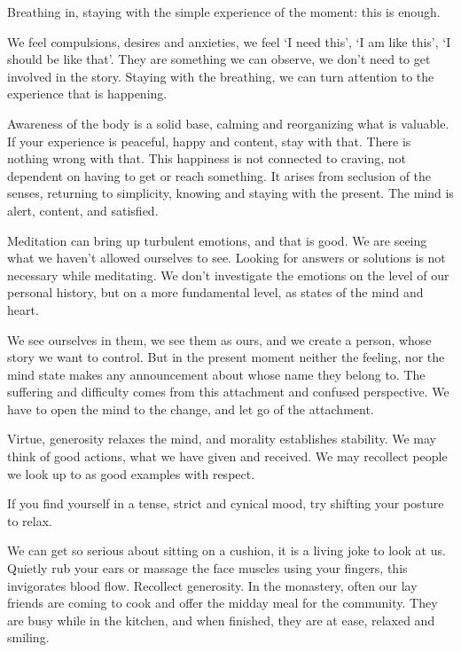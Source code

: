 
Breathing in, staying with the simple experience of the moment: this is
enough.

We feel compulsions, desires and anxieties, we feel `I need this', `I am
like this', `I should be like that'. They are something we can observe,
we don't need to get involved in the story. Staying with the breathing,
we can turn attention to the experience that is happening.

Awareness of the body is a solid base, calming and reorganizing what is
valuable. If your experience is peaceful, happy and content, stay with
that. There is nothing wrong with that. This happiness is not connected
to craving, not dependent on having to get or reach something. It arises
from seclusion of the senses, returning to simplicity, knowing and
staying with the present. The mind is alert, content, and satisfied.

\clearpage

Meditation can bring up turbulent emotions, and that is good. We are
seeing what we haven't allowed ourselves to see. Looking for answers or
solutions is not necessary while meditating. We don't investigate the
emotions on the level of our personal history, but on a more fundamental
level, as states of the mind and heart.

We see ourselves in them, we see them as ours, and we create a person,
whose story we want to control. But in the present moment neither the
feeling, nor the mind state makes any announcement about whose name they
belong to. The suffering and difficulty comes from this attachment and
confused perspective. We have to open the mind to the change, and let go
of the attachment.


Virtue, generosity relaxes the mind, and morality establishes stability.
We may think of good actions, what we have given and received. We may
recollect people we look up to as good examples with respect.

If you find yourself in a tense, strict and cynical mood, try shifting
your posture to relax.

We can get so serious about sitting on a cushion, it is a living joke to
look at us. Quietly rub your ears or massage the face muscles using your
fingers, this invigorates blood flow. Recollect generosity. In the
monastery, often our lay friends are coming to cook and offer the midday
meal for the community. They are busy while in the kitchen, and when
finished, they are at ease, relaxed and smiling.

